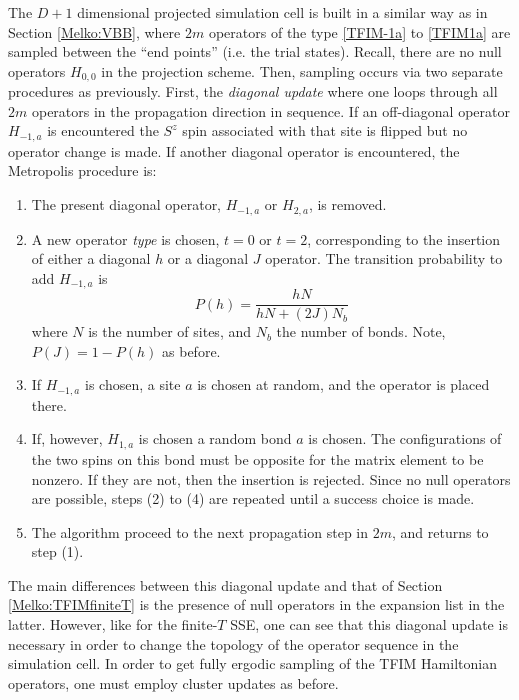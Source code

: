 \documentclass[vecphys]{svmult}
\begin{document}
The $D+1$ dimensional projected simulation cell is built in a similar way as in Section \ref{Melko:VBB}, where $2m$ operators of the type \ref{TFIM-1a} to \ref{TFIM1a}  are sampled between the ``end points'' (i.e. the trial states).  Recall, there are no null operators $H_{0,0}$ in the projection scheme.  Then, sampling occurs via two separate procedures as previously.  First, the {\em diagonal update} where one loops through all $2m$ operators in the propagation direction in sequence. If an off-diagonal operator $H_{-1,a}$ is encountered the $S^z$ spin associated with that site is flipped but no operator change is made.  If another diagonal operator is encountered, the Metropolis procedure is:
\begin{enumerate}
\item The present diagonal operator,  $H_{-1,a}$ or  $H_{2,a}$, is removed. 
\item A new operator {\em type} is chosen, $t=0$ or $t=2$, corresponding to the insertion of either a diagonal $h$ or a diagonal $J$ operator.  The transition probability to add $H_{-1,a}$ is 
\begin{equation}
P(h) = \frac{h N}{hN + (2J)N_b}
\end{equation}
where $N$ is the number of sites, and $N_b$ the number of bonds.  Note, $P(J) = 1- P(h)$ as before.  %
\item If $H_{-1,a}$ is chosen, a site $a$ is chosen at random, and the operator is placed there.
\item If, however, $H_{1,a}$ is chosen a random {\rm bond} $a$ is chosen.  The configurations of the two spins on this bond must be opposite for the matrix element to be nonzero.  If they are not, then the insertion is rejected.   Since no null operators are possible, steps (2) to (4) are repeated until a success choice is made.
\item The algorithm proceed to the next propagation step in $2m$, and returns to step (1).
\end{enumerate}
The main differences between this diagonal update and that of Section \ref{Melko:TFIMfiniteT} is the presence of null operators in the expansion list in the latter.  However, like for the finite-$T$ SSE, one can see that this diagonal update is necessary in order to change the topology of the operator sequence in the simulation cell.  In order to get fully ergodic sampling of the TFIM Hamiltonian operators, one must employ cluster updates as before.
\end{document}
